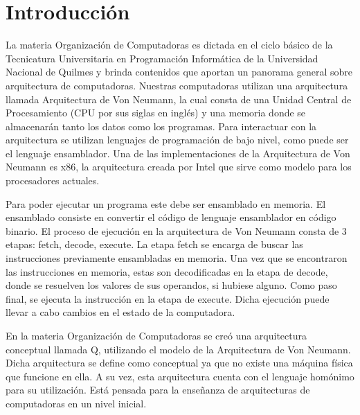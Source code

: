 \part{Introducción}
\label{introduccion}

La materia Organización de Computadoras es dictada en el ciclo básico de la Tecnicatura Universitaria en Programación Informática de la Universidad Nacional 
de Quilmes y brinda contenidos que aportan un panorama general sobre arquitectura de computadoras. 
Nuestras computadoras utilizan una arquitectura llamada Arquitectura de Von Neumann, la cual consta de una Unidad Central de Procesamiento (CPU por sus 
siglas en inglés) y una memoria donde se almacenarán tanto los datos como los programas. Para interactuar con la arquitectura se utilizan lenguajes de 
programación de bajo nivel, como puede ser el lenguaje ensamblador.
Una de las implementaciones de la Arquitectura de Von Neumann es x86, la arquitectura creada por Intel que sirve como modelo para los procesadores actuales.

Para poder ejecutar un programa este debe ser ensamblado en memoria. El ensamblado consiste en convertir el código de lenguaje ensamblador en código 
binario.
El proceso de ejecución en la arquitectura de Von Neumann consta de 3 etapas: fetch, decode, execute.
La etapa fetch se encarga de buscar las instrucciones previamente ensambladas en memoria.
Una vez que se encontraron las instrucciones en memoria, estas son decodificadas en la etapa de decode, donde se resuelven los valores de sus operandos, si
hubiese alguno.
Como paso final, se ejecuta la instrucción en la etapa de execute. Dicha ejecución puede llevar a cabo cambios en el estado de la computadora.

En la materia Organización de Computadoras se creó una arquitectura conceptual llamada Q, utilizando el modelo de la Arquitectura de Von Neumann. Dicha arquitectura se define como conceptual ya que no existe una máquina física que funcione en ella.
A su vez, esta arquitectura cuenta con el lenguaje homónimo para su utilización. Está pensada para la enseñanza de arquitecturas de computadoras en un nivel inicial.

